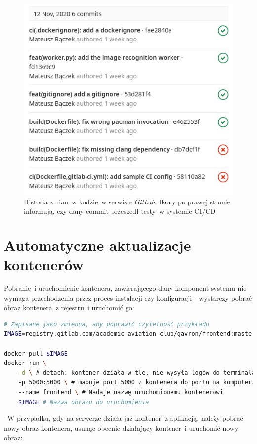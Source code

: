 \begin{figure}[H]
  \centering
  \includegraphics[width=.7\linewidth]{rys04/gitlab_ci_commit_status.png}
  \caption{ Historia zmian~w kodzie~w serwisie \textit{GitLab}.
  Ikony po prawej stronie informują, czy dany commit przeszedł testy~w systemie CI/CD }
	\label{gitlab_ci_history}
\end{figure}

\section{Automatyczne aktualizacje kontenerów} \label{ouroboros}

Pobranie~i uruchomienie kontenera, zawierającego dany komponent systemu
nie wymaga przechodzenia przez proces instalacji czy konfiguracji - wystarczy
pobrać obraz kontenera~z rejestru~i uruchomić go:

\begin{lstlisting}[language=bash, label=list:docker_clone_run_example,caption={Pobranie~i uruchomienie obrazu dockera, zawierającego aplikację}, basicstyle=\footnotesize\ttfamily]
# Zapisane jako zmienna, aby poprawić czytelność przykładu 
IMAGE=registry.gitlab.com/academic-aviation-club/gavron/frontend:master

docker pull $IMAGE
docker run \
    -d \ # detach: kontener działa w tle, nie wysyła logów do terminala
    -p 5000:5000 \ # mapuje port 5000 z kontenera do portu na komputerze  
    --name frontend \ # Nadaje nazwę uruchomionemu kontenerowi
    $IMAGE # Nazwa obrazu do uruchomienia 
\end{lstlisting}
~W przypadku, gdy na serwerze działa już kontener~z aplikacją, należy
pobrać nowy obraz kontenera, usunąc obecnie działający kontener~i uruchomić
nowy obraz:

